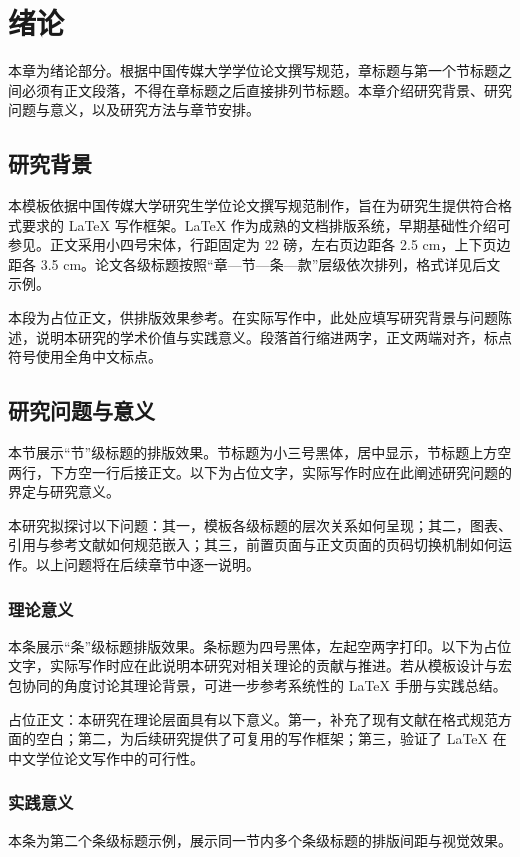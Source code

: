 \chapter*{绪论}

本章为绪论部分。根据中国传媒大学学位论文撰写规范，章标题与第一个节标题之间必须有正文段落，不得在章标题之后直接排列节标题。本章介绍研究背景、研究问题与意义，以及研究方法与章节安排。

\section{研究背景}
本模板依据中国传媒大学研究生学位论文撰写规范制作，旨在为研究生提供符合格式要求的 \LaTeX{} 写作框架。\LaTeX{} 作为成熟的文档排版系统，早期基础性介绍可参见\nocite{lamport1994}。正文采用小四号宋体，行距固定为 22 磅，左右页边距各 2.5 cm，上下页边距各 3.5 cm。论文各级标题按照“章—节—条—款”层级依次排列，格式详见后文示例。

本段为占位正文，供排版效果参考。在实际写作中，此处应填写研究背景与问题陈述，说明本研究的学术价值与实践意义。段落首行缩进两字，正文两端对齐，标点符号使用全角中文标点。

\section{研究问题与意义}
本节展示“节”级标题的排版效果。节标题为小三号黑体，居中显示，节标题上方空两行，下方空一行后接正文。以下为占位文字，实际写作时应在此阐述研究问题的界定与研究意义。

本研究拟探讨以下问题：其一，模板各级标题的层次关系如何呈现；其二，图表、引用与参考文献如何规范嵌入；其三，前置页面与正文页面的页码切换机制如何运作。以上问题将在后续章节中逐一说明。

\subsection{理论意义}
本条展示“条”级标题排版效果。条标题为四号黑体，左起空两字打印。以下为占位文字，实际写作时应在此说明本研究对相关理论的贡献与推进。若从模板设计与宏包协同的角度讨论其理论背景，可进一步参考系统性的 \LaTeX{} 手册与实践总结\nocite{mittelbach2004}。

占位正文：本研究在理论层面具有以下意义。第一，补充了现有文献在格式规范方面的空白；第二，为后续研究提供了可复用的写作框架；第三，验证了 \LaTeX{} 在中文学位论文写作中的可行性。

\subsection{实践意义}
本条为第二个条级标题示例，展示同一节内多个条级标题的排版间距与视觉效果。

